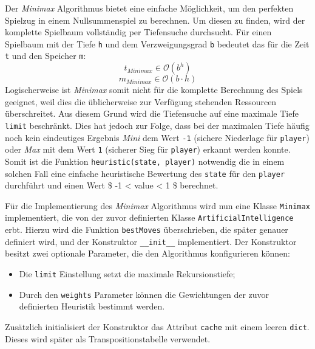 \documentclass[11pt]{article}
\providecommand{\tightlist}{%
      \setlength{\itemsep}{0pt}\setlength{\parskip}{0pt}}
\begin{document}
Der \emph{Minimax} Algorithmus bietet eine einfache Möglichkeit, um den
perfekten Spielzug in einem Nullsummenspiel zu berechnen. Um diesen zu
finden, wird der komplette Spielbaum vollständig per Tiefensuche
durchsucht. Für einen Spielbaum mit der Tiefe \texttt{h} und dem
Verzweigungsgrad \texttt{b} bedeutet das für die Zeit \texttt{t} und den
Speicher \texttt{m}: \[ t_{Minimax} \in \mathcal{O}(b^h) \]
\[ m_{Minimax} \in \mathcal{O}(b\cdot h) \] Logischerweise ist
\emph{Minimax} somit nicht für die komplette Berechnung des Spiels
geeignet, weil dies die üblicherweise zur Verfügung stehenden Ressourcen
überschreitet. Aus diesem Grund wird die Tiefensuche auf eine maximale
Tiefe \texttt{limit} beschränkt. Dies hat jedoch zur Folge, dass bei der
maximalen Tiefe häufig noch kein eindeutiges Ergebnis \emph{Mini} dem
Wert \texttt{-1} (sichere Niederlage für \texttt{player}) oder
\emph{Max} mit dem Wert \texttt{1} (sicherer Sieg für \texttt{player})
erkannt werden konnte. Somit ist die Funktion
\texttt{heuristic(state,\ player)} notwendig die in einem solchen Fall
eine einfache heuristische Bewertung des \texttt{state} für den
\texttt{player} durchführt und einen Wert \$ -1 \textless{} value
\textless{} 1 \$ berechnet.

    Für die Implementierung des \emph{Minimax} Algorithmus wird nun eine
Klasse \texttt{Minimax} implementiert, die von der zuvor definierten
Klasse \texttt{ArtificialIntelligence} erbt. Hierzu wird die Funktion
\texttt{bestMoves} überschrieben, die später genauer definiert wird, und
der Konstruktor \texttt{\_\_init\_\_} implementiert. Der Konstruktor
besitzt zwei optionale Parameter, die den Algorithmus konfigurieren
können:

\begin{itemize}
\tightlist
\item
  Die \texttt{limit} Einstellung setzt die maximale Rekursionstiefe;
\item
  Durch den \texttt{weights} Parameter können die Gewichtungen der zuvor
  definierten Heuristik bestimmt werden.
\end{itemize}

Zusätzlich initialisiert der Konstruktor das Attribut \texttt{cache} mit
einem leeren \texttt{dict}. Dieses wird später als Transpositionstabelle
verwendet.
\end{document}
